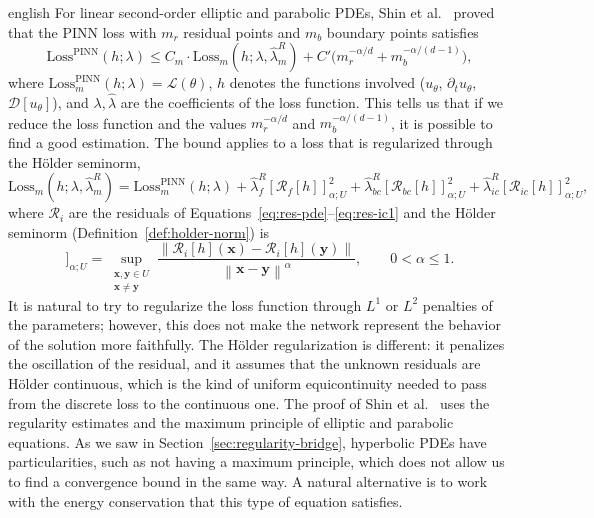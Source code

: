 \documentclass[11pt,letterpaper,twoside,openright]{book} %
\newcommand{\norm}[1]{\left\lVert #1 \right\rVert}
\newcommand{\Loss}{\mathcal{L}}
\newif\ifreviewmode
\newcommand{\revtag}[2]{\ifreviewmode{\color{red!70!black}\textsf{\footnotesize[#1#2]}}\fi}
\newcommand{\verificar}[1]{\revtag{VERIFICAR}{: #1}}
\begin{document}
\begin{hyphenrules}{english}
For linear second-order elliptic and parabolic PDEs, Shin et al.~\cite{shin2020convergence} proved that the
PINN loss with $m_r$ residual points and $m_b$ boundary points satisfies
\begin{equation}
  \mathrm{Loss}^{\mathrm{PINN}}(h;\lambda)\le C_m\cdot\mathrm{Loss}_m(h;\lambda,\hat\lambda^{R}_m)
  +C'\big(m_r^{-\alpha/d}+m_b^{-\alpha/(d-1)}\big),
  \label{eq:shin-bound}
\end{equation}
where $\mathrm{Loss}^{\mathrm{PINN}}_m(h;\lambda)=\Loss(\theta)$, $h$ denotes the functions involved
($u_\theta$, $\partial_t u_\theta$, $\mathcal{D}[u_\theta]$), and $\lambda,\hat\lambda$ are the
coefficients of the loss function.\verificar{exponents of $m_r$ and $m_b$ against the original}
This tells us that if we reduce the loss function and the values $m_r^{-\alpha/d}$ and
$m_b^{-\alpha/(d-1)}$, it is possible to find a good estimation. The bound applies to a loss that is
regularized through the Hölder seminorm,
\begin{equation}
  \mathrm{Loss}_m(h;\lambda,\hat\lambda^{R}_m)=\mathrm{Loss}^{\mathrm{PINN}}_m(h;\lambda)
  +\hat\lambda^{R}_f[\mathcal{R}_f[h]]^2_{\alpha;U}+\hat\lambda^{R}_{bc}[\mathcal{R}_{bc}[h]]^2_{\alpha;U}
  +\hat\lambda^{R}_{ic}[\mathcal{R}_{ic}[h]]^2_{\alpha;U},
  \label{eq:shin-regularized}
\end{equation}
where $\mathcal{R}_i$ are the residuals of Equations~\eqref{eq:res-pde}--\eqref{eq:res-ic1} and the Hölder seminorm
(Definition~\ref{def:holder-norm}) is
\begin{equation}
  [\mathcal{R}_i[h]]_{\alpha;U}=\sup_{\substack{\mathbf{x},\mathbf{y}\in U\\ \mathbf{x}\neq\mathbf{y}}}
  \frac{\norm{\mathcal{R}_i[h](\mathbf{x})-\mathcal{R}_i[h](\mathbf{y})}}{\norm{\mathbf{x}-\mathbf{y}}^{\alpha}},\qquad0<\alpha\le1.
  \label{eq:holder-seminorm-loss}
\end{equation}
It is natural to try to regularize the loss function through $L^1$ or $L^2$ penalties of the
parameters; however, this does not make the network represent the behavior of the solution more
faithfully. The Hölder regularization is different: it penalizes the oscillation of the residual, and it
assumes that the unknown residuals are Hölder continuous, which is the kind of uniform equicontinuity
needed to pass from the discrete loss to the continuous one. The proof of Shin et al.~\cite{shin2020convergence}
uses the regularity estimates and the maximum principle of elliptic and parabolic equations. As we saw
in Section~\ref{sec:regularity-bridge}, hyperbolic PDEs have particularities, such as not having a maximum
principle, which does not allow us to find a convergence bound in the same way. A natural alternative is
to work with the energy conservation that this type of equation satisfies.


\end{hyphenrules}
\end{document}
